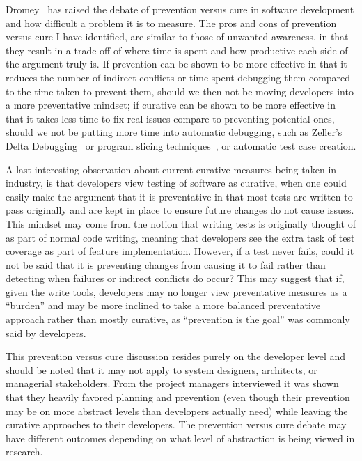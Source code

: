 Dromey~\cite{Dromey:2003} has raised the debate of prevention versus cure in software development and how difficult a problem it is
to measure. The pros and cons of prevention versus cure I have identified, are similar to those of unwanted awareness,
in that they result in a trade off 
of where time is spent and how productive each side of the argument truly is. If prevention can be shown to be more effective in that
it reduces the number of indirect conflicts or time spent debugging them compared to the time taken to prevent them, should we then
not be moving developers into a more preventative mindset; if curative can be shown to be more effective in that it takes less time
to fix real issues compare to preventing potential ones, should we not be putting more time into automatic debugging, such as
Zeller's Delta Debugging~\cite{Zeller:2002:ICC} or program slicing techniques~\cite{Weiser:1982:PUS}, or automatic test case creation.

A last interesting observation about current curative measures being taken in industry, is that developers view testing of software 
as curative, when one could easily make the argument that it is preventative in that most tests are written to pass originally and
are kept in place to ensure future changes do not cause issues. This mindset may come from the notion that writing tests is originally
thought of as part of normal code writing, meaning that developers see the extra task of test coverage as part of feature implementation.
However, if a test never fails, could it not be said that it is preventing changes from causing it to fail rather than detecting
when failures or indirect conflicts do occur? This may suggest that if, given the write tools, developers may no longer view preventative
measures as a ``burden'' and may be more inclined to take a more balanced preventative approach rather than mostly curative, as
``prevention is the goal'' was commonly said by developers.

This prevention versus cure discussion resides purely on the developer level and should be noted that it may not apply to system
designers, architects, or managerial stakeholders. 
From the project managers interviewed it was shown that they heavily favored planning and 
prevention (even though their prevention may be on more abstract levels than developers actually need) while leaving the curative
approaches to their developers. The prevention versus cure debate may have different outcomes depending on what level of abstraction
is being viewed in research.

